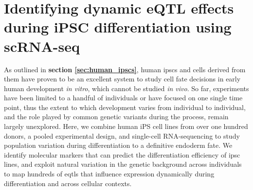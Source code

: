 
\chapter{Identifying dynamic eQTL effects during iPSC differentiation using scRNA-seq}
\label{chapter4}

As outlined in \textbf{section \ref{sec:human_ipscs}}, human \glspl{ipsc} and cells derived from them have proven to be an excellent system to study cell fate decisions in early human development \textit{in vitro}, which cannot be studied \textit{in vivo}.
So far, experiments have been limited to a handful of individuals or have focused on one single time point, thus the extent to which development varies from individual to individual, and the role played by common genetic variants during the process, remain largely unexplored.
Here, we combine human iPS cell lines from over one hundred donors, a pooled experimental design, and single-cell RNA-sequencing to study population variation during differentiation to a definitive endoderm fate. 
We identify molecular markers that can predict the differentiation efficiency of \gls{ipsc} lines, and exploit natural variation in the genetic background across individuals to map hundreds of \glspl{eqtl} that influence expression dynamically during differentiation and across cellular contexts.\\

\newpage

